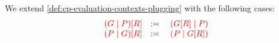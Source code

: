 \begin{definition}[Plugging]\label{def:nc-evaluation-contexts-plugging}
  We extend \cref{def:cp-evaluation-contexts-plugging} with the following cases:
  \[\!
    \begin{array}{lcl}
      \textcolor{red}{{(G \mid P)}[{R}]} &:=& \; \textcolor{red}{({G}[{R}] \mid P)} \\
      \textcolor{red}{{(P \mid G)}[{R}]} &:=& \; \textcolor{red}{(P \mid {G}[{R}])}
    \end{array}
  \]
\end{definition}
